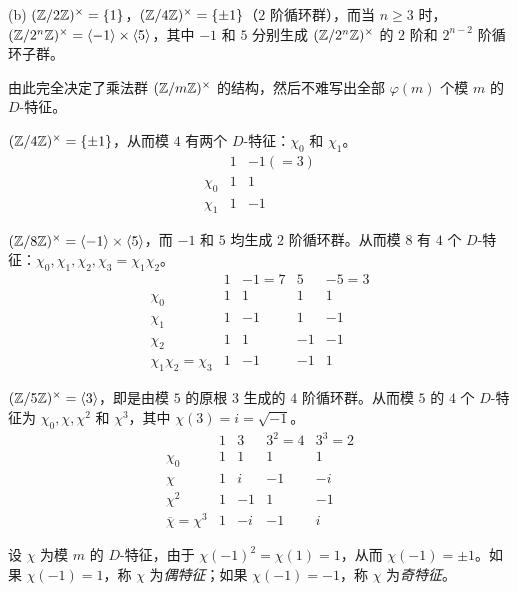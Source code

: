 (b) $(\mathbb{Z}/2\mathbb{Z})^{\times}=\{1\}$，$(\mathbb{Z}/4\mathbb{Z})^{\times}=\{\pm1\}$（$2$ 阶循环群），而当 $n\geqslant 3$ 时，$(\mathbb{Z}/2^n\mathbb{Z})^{\times}=\langle-1\rangle\times\langle5\rangle$，其中 $-1$ 和 $5$ 分别生成 $(\mathbb{Z}/2^n\mathbb{Z})^{\times}$ 的 $2$ 阶和 $2^{n-2}$ 阶循环子群。

由此完全决定了乘法群 $(\mathbb{Z}/m\mathbb{Z})^{\times}$ 的结构，然后不难写出全部 $\varphi(m)$ 个模 $m$ 的 $D$-特征。

\setcounter{example}{0}%

\begin{example}
$(\mathbb{Z}/4\mathbb{Z})^{\times}=\{\pm1\}$，从而模 $4$ 有两个 $D$-特征：$\chi_0$ 和 $\chi_1$。
\[
  \begin{array}{c|cc}
    & 1 & -1(=3)\\ \hline
    \chi_0 & 1 & 1\\
    \chi_1 & 1 & -1
  \end{array}
\]
\end{example}

\begin{example}
$(\mathbb{Z}/8\mathbb{Z})^{\times}=\langle-1\rangle\times\langle5\rangle$，而 $-1$ 和 $5$ 均生成 $2$ 阶循环群。从而模 $8$ 有 $4$ 个 $D$-特征：$\chi_0,\chi_1,\chi_2,\chi_3=\chi_1\chi_2$。
\[
  \begin{array}{c|cccc}
    & 1 & -1=7 & 5 & -5=3\\ \hline
    \chi_0 & 1 & 1 & 1 & 1\\
    \chi_1 & 1 & -1 & 1 & -1\\
    \chi_2 & 1 & 1 & -1 & -1\\
    \chi_1\chi_2=\chi_3 & 1 & -1 & -1 & 1
  \end{array}
\]
\end{example}

\begin{example}
$(\mathbb{Z}/5\mathbb{Z})^{\times}=\langle3\rangle$，即是由模 $5$ 的原根 $3$ 生成的 $4$ 阶循环群。从而模 $5$ 的 $4$ 个 $D$-特征为 $\chi_0,\chi,\chi^2$ 和 $\chi^3$，其中 $\chi(3)=i=\sqrt{-1}$。
\[
  \begin{array}{c|cccc}
    & 1 & 3 & 3^2=4 & 3^3=2\\ \hline
    \chi_0 & 1 & 1 & 1 & 1\\
    \chi & 1 & i & -1 & -i\\
    \chi^2 & 1 & -1 & 1 & -1\\
    \overline{\chi}=\chi^3 & 1 & -i & -1 & i
  \end{array}
\]
\end{example}

\begin{definition}\label{def:ch4-5}
设 $\chi$ 为模 $m$ 的 $D$-特征，由于 $\chi(-1)^2=\chi(1)=1$，从而 $\chi(-1)=\pm1$。如果 $\chi(-1)=1$，称 $\chi$ 为\emph{偶特征}；如果 $\chi(-1)=-1$，称 $\chi$ 为\emph{奇特征}。
\end{definition}

